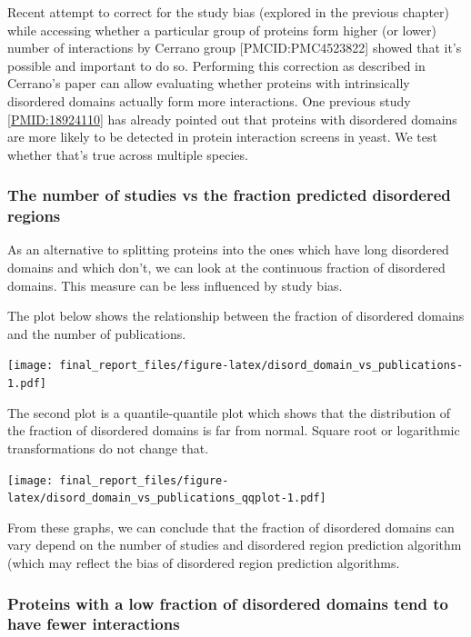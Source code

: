 \documentclass[]{article}
\begin{document}
Recent attempt to correct for the study bias (explored in the previous
chapter) while accessing whether a particular group of proteins form
higher (or lower) number of interactions by Cerrano group
{[}PMCID:PMC4523822{]} showed that it's possible and important to do so.
Performing this correction as described in Cerrano's paper can allow
evaluating whether proteins with intrinsically disordered domains
actually form more interactions. One previous study
{[}\url{PMID:18924110}{]} has already pointed out that proteins with
disordered domains are more likely to be detected in protein interaction
screens in yeast. We test whether that's true across multiple species.

\subsubsection{The number of studies vs the fraction predicted
disordered
regions}\label{the-number-of-studies-vs-the-fraction-predicted-disordered-regions}

As an alternative to splitting proteins into the ones which have long
disordered domains and which don't, we can look at the continuous
fraction of disordered domains. This measure can be less influenced by
study bias.

The plot below shows the relationship between the fraction of disordered
domains and the number of publications.

\texttt{[image: final\_report\_files/figure-latex/disord\_domain\_vs\_publications-1.pdf]}

The second plot is a quantile-quantile plot which shows that the
distribution of the fraction of disordered domains is far from normal.
Square root or logarithmic transformations do not change that.

\texttt{[image: final\_report\_files/figure-latex/disord\_domain\_vs\_publications\_qqplot-1.pdf]}

From these graphs, we can conclude that the fraction of disordered
domains can vary depend on the number of studies and disordered region
prediction algorithm (which may reflect the bias of disordered region
prediction algorithms.

\subsubsection{Proteins with a low fraction of disordered domains tend
to have fewer
interactions}\label{proteins-with-a-low-fraction-of-disordered-domains-tend-to-have-fewer-interactions}
\end{document}
